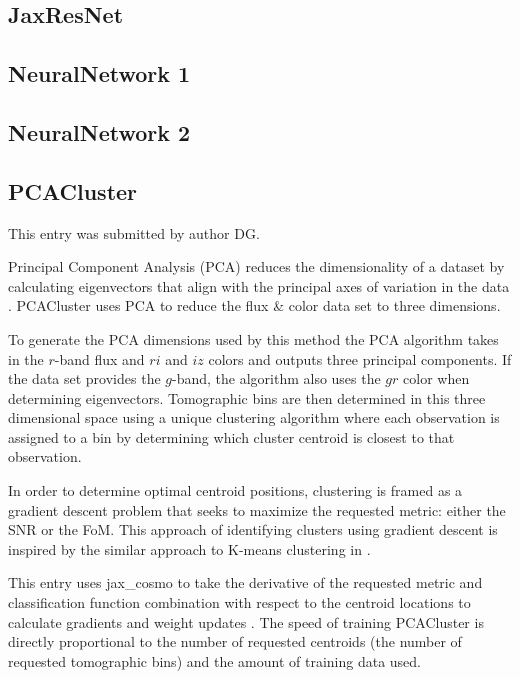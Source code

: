 \documentclass[twocolumn,twocolappendix]{aastex63}
\begin{document}
\subsection{ {\sc JaxResNet} }


\subsection{ {\sc NeuralNetwork 1} }


\subsection{ {\sc NeuralNetwork 2} }


\subsection{ {\sc PCACluster} }
This entry was submitted by author DG.

Principal Component Analysis (PCA) reduces the dimensionality of a dataset by
calculating eigenvectors that align with the principal axes of variation in the
data \citep{doi:10.1098}. {\sc PCACluster} uses PCA to reduce the flux \& color
data set to three dimensions. 

To generate the PCA dimensions used by this method the PCA algorithm takes in
the $r$-band flux and $ri$ and $iz$ colors and outputs three principal
components.  If the data set provides the $g$-band, the algorithm also uses the
$gr$ color when determining eigenvectors. Tomographic bins are then determined
in this three dimensional space using a unique clustering algorithm where each
observation is assigned to a bin by determining which cluster centroid is
closest to that observation.

In order to determine optimal centroid positions, clustering is framed as a
gradient descent problem that seeks to maximize the requested metric: either the
SNR or the FoM. This approach of identifying clusters using gradient descent is
inspired by the similar approach to K-means clustering in
\citet{NIPS1994_a1140a3d}.

This entry uses {\sc jax\_cosmo} to take the derivative of the requested metric
and classification function combination with respect to the centroid locations
to calculate gradients and weight updates \citep{jax-cosmo}.  The speed of
training PCACluster is directly proportional to the number of requested
centroids (the number of requested tomographic bins) and the amount of training
data used.
\end{document}
